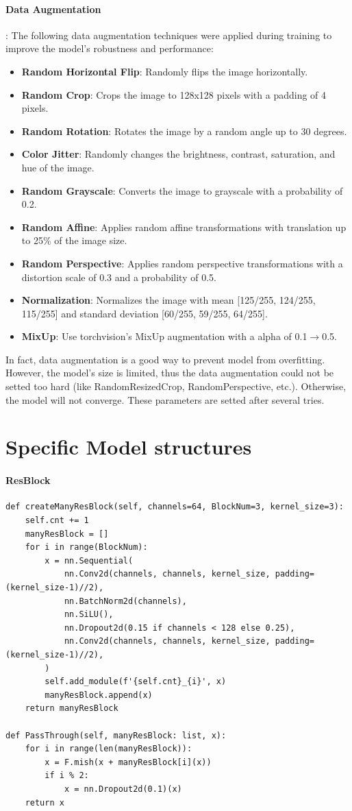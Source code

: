 \documentclass[a4 paper,12pt]{article}
\theoremstyle{definitionstyle}
\begin{document}
\paragraph{Data Augmentation}:
The following data augmentation techniques were applied during training to improve the model's robustness and performance:
\begin{itemize}
    \item \textbf{Random Horizontal Flip}: Randomly flips the image horizontally.
    \item \textbf{Random Crop}: Crops the image to 128x128 pixels with a padding of 4 pixels.
    \item \textbf{Random Rotation}: Rotates the image by a random angle up to 30 degrees.
    \item \textbf{Color Jitter}: Randomly changes the brightness, contrast, saturation, and hue of the image.
    \item \textbf{Random Grayscale}: Converts the image to grayscale with a probability of 0.2.
    \item \textbf{Random Affine}: Applies random affine transformations with translation up to 25\% of the image size.
    \item \textbf{Random Perspective}: Applies random perspective transformations with a distortion scale of 0.3 and a probability of 0.5.
    \item \textbf{Normalization}: Normalizes the image with mean [125/255, 124/255, 115/255] and standard deviation [60/255, 59/255, 64/255].
    \item \textbf{MixUp}: Use torchvision's MixUp augmentation with a alpha of 0.1$\to$0.5.
\end{itemize}
In fact, data augmentation is a good way to prevent model from overfitting. However, the model's size is limited, thus the data augmentation could not be setted too hard (like RandomResizedCrop, RandomPerspective, etc.). Otherwise, the model will not converge. These parameters are setted after several tries.
\section*{Specific Model structures}
\paragraph{ResBlock}
\begin{verbatim}
def createManyResBlock(self, channels=64, BlockNum=3, kernel_size=3):
    self.cnt += 1
    manyResBlock = []
    for i in range(BlockNum):
        x = nn.Sequential(
            nn.Conv2d(channels, channels, kernel_size, padding=(kernel_size-1)//2),
            nn.BatchNorm2d(channels),
            nn.SiLU(),
            nn.Dropout2d(0.15 if channels < 128 else 0.25),
            nn.Conv2d(channels, channels, kernel_size, padding=(kernel_size-1)//2),
        )
        self.add_module(f'{self.cnt}_{i}', x)
        manyResBlock.append(x)
    return manyResBlock

def PassThrough(self, manyResBlock: list, x):
    for i in range(len(manyResBlock)):
        x = F.mish(x + manyResBlock[i](x))
        if i % 2:
            x = nn.Dropout2d(0.1)(x)
    return x
\end{verbatim}
\end{document}
